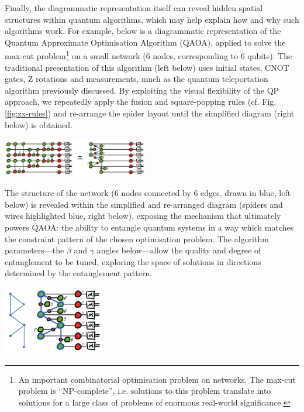 Finally, the diagrammatic representation itself can reveal hidden spatial structures within quantum algorithms, which may help explain how and why such algorithms work.
For example, below is a diagrammatic representation of the Quantum Approximate Optimisation Algorithm (QAOA), applied to solve the max-cut problem\footnote{An important combinatorial optimisation problem on networks. The max-cut problem is ``NP-complete'', i.e. solutions to this problem translate into solutions for a large class of problems of enormous real-world significance.} on a small network (6 nodes, corresponding to 6 qubits).
The traditional presentation of this algorithm (left below) uses initial states, CNOT gates, Z rotations and measurements, much as the quantum teleportation algorithm previously discussed.
By exploiting the visual flexibility of the QP approach, we repeatedly apply the fusion and square-popping rules (cf. Fig. \ref{fig:zx-rules}) and re-arrange the spider layout until the simplified diagram (right below) is obtained.
\begin{center}
    \includegraphics[width=0.48\textwidth]{Sections/pictures/diagrammatic-reasoning-qaoa-eq.png}
\end{center}
The structure of the network (6 nodes connected by 6 edges, drawn in blue, left below) is revealed within the simplified and re-arranged diagram (spiders and wires highlighted blue, right below), exposing the mechanism that ultimately powers QAOA: the ability to entangle quantum systems in a way which matches the constraint pattern of the chosen optimisation problem.
The algorithm parameters---the $\beta$ and $\gamma$ angles below---allow the quality and degree of entanglement to be tuned, exploring the space of solutions in directions determined by the entanglement pattern.
\begin{center}
    \includegraphics[width=0.34\textwidth]{Sections/pictures/qaoa-circ.png}
\end{center}


